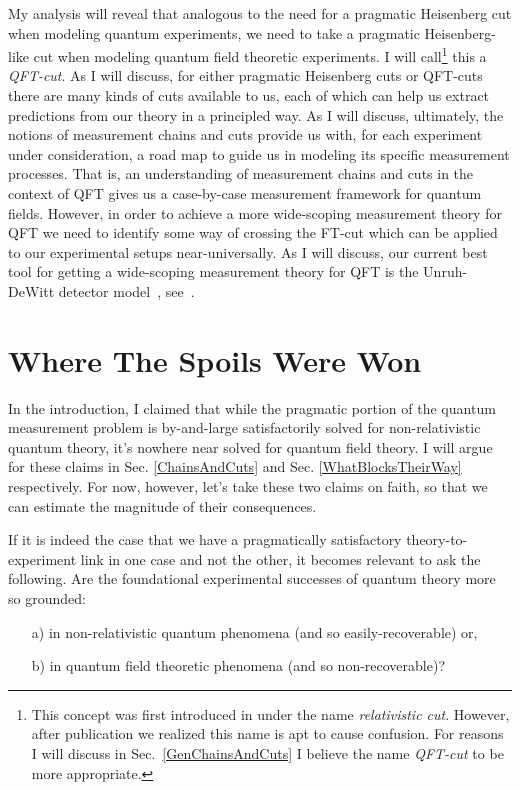 \documentclass[12pt,prd,superscriptaddress,floatfix,amsmath,amssymb,amsfonts,nofootinbib]{revtex4-2}
\begin{document}
My analysis will reveal that analogous to the need for a pragmatic Heisenberg cut when modeling quantum experiments, we need to take a pragmatic Heisenberg-like cut when modeling quantum field theoretic experiments. I will call\footnote{This concept was first introduced in \cite{TaleOfTwo} under the name \textit{relativistic cut}. However, after publication we realized this name is apt to cause confusion. For reasons I will discuss in Sec.~\ref{GenChainsAndCuts} I believe the name \textit{QFT-cut} to be more appropriate.} this a \textit{QFT-cut}. As I will discuss, for either pragmatic Heisenberg cuts or QFT-cuts there are many kinds of cuts available to us, each of which can help us extract predictions from our theory in a principled way. As I will discuss, ultimately, the notions of measurement chains and cuts provide us with, for each experiment under consideration, a road map to guide us in modeling its specific measurement processes. That is, an understanding of measurement chains and cuts in the context of QFT gives us a case-by-case measurement framework for quantum fields. However, in order to achieve a more wide-scoping measurement theory for QFT we need to identify some way of crossing the FT-cut which can be applied to our experimental setups near-universally. As I will discuss, our current best tool for getting a wide-scoping measurement theory for QFT is the Unruh-DeWitt detector model~\cite{Unruh1976,BLHu2007, Brown2013, Hotta2020, Zeromode,TaleOfTwo,Adam,Valentini1991, Reznik2003, Pozas-Kerstjens:2015,Menicucci, Terno2016, Cosmo, Henderson2018}, see~\cite{pologomez2021detectorbased}.

\section{Where The Spoils Were Won}\label{WhereTheSpoilsWereWon}
In the introduction, I claimed that while the pragmatic portion of the quantum measurement problem is by-and-large satisfactorily solved for non-relativistic quantum theory, it's nowhere near solved for quantum field theory. I will argue for these claims in Sec. \ref{ChainsAndCuts} and Sec. \ref{WhatBlocksTheirWay} respectively. For now, however, let's take these two claims on faith, so that we can estimate the magnitude of their consequences. 

If it is indeed the case that we have a pragmatically satisfactory theory-to-experiment link in one case and not the other, it becomes relevant to ask the following. Are the foundational experimental successes of quantum theory more so grounded:
\begin{itemize}
    \item[a)] in non-relativistic quantum phenomena (and so easily-recoverable) or,
    \item[b)] in quantum field theoretic phenomena (and so non-recoverable)?
\end{itemize}
 
\end{document}
